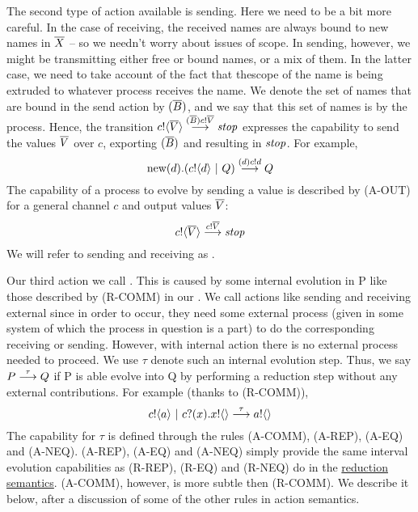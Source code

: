 The second type of action available is sending.  
Here we need to be a bit more careful.  
In the case of receiving, the received names are always bound to new names in $\overline{X}$ -- so we needn't worry about issues of scope.  
In sending, however, we might be transmitting either free or bound names, or a mix of them.  
In the latter case, we need to take account of the fact that thescope of the name is being extruded to whatever process receives the name.  
We denote the set of names that are bound in the send action by $({\overline{B}})$, and we say that this set of names is  by the process.  
Hence, the transition ${c}!\langle{ \ensuremath{\overline{V}} }\rangle \overset{{({\overline{B}}){c}!{\overline{V}}}}{\longrightarrow} \mbox{\emph{stop}}$ expresses the capability to send the values $\overline{V}$ over $c$, exporting $({\overline{B}})$ and resulting in $\mbox{\emph{stop}}$.  
For example,
\[
	\text{new}({d}).({c}!\langle{d}\rangle \ |\  Q) \overset{{({d}){c}!{d}}}{\longrightarrow} Q
\]
The capability of a process to evolve by sending a value is described by (A-OUT) for a general channel $c$ and output values $\overline{V}$:
\[
	{c}!\langle{ \ensuremath{\overline{V}} }\rangle \overset{{{c}!{\overline{V}}}}{\longrightarrow} \mbox{\emph{stop}} 
\]
We will refer to sending and receiving as .

Our third action we call . 
This is caused by some internal evolution in P like those described by (R-COMM) in our .  
We call actions like sending and receiving external since in order to occur, they need some external process (given in some system of which the process in question is a part) to do the corresponding receiving or sending.  
However, with internal action there is no external process needed to proceed.  
We use $\tau$ denote such an internal evolution step.  
Thus, we say $P \overset{{\tau}}{\longrightarrow} Q$ if P is able evolve into Q by performing a reduction step without any external contributions.  
For example (thanks to (R-COMM)),
\[
	{c}!\langle{a}\rangle \ |\  {c}?({x}).{x}!\langle{}\rangle \overset{{\tau}}{\longrightarrow} {a}!\langle{}\rangle 
\]
The capability for $\tau$ is defined through the rules (A-COMM), (A-REP), (A-EQ) and (A-NEQ).  (A-REP), (A-EQ) and (A-NEQ) simply provide the same interval evolution capabilities as (R-REP), (R-EQ) and (R-NEQ) do in the \hyperref[secreducationsemantics]{reduction semantics}. (A-COMM), however, is more subtle then (R-COMM).  We describe it below, after a discussion of some of the other rules in action semantics.

